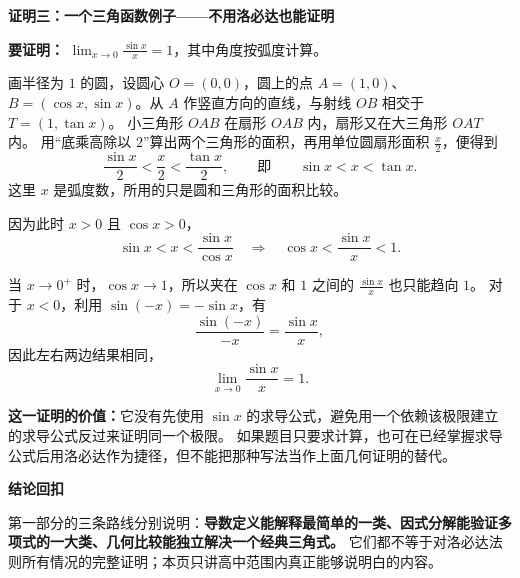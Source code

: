 \begin{proofbox}
\textbf{\textcolor{CProof}{证明三：一个三角函数例子——不用洛必达也能证明}}
\begin{center}\end{center}


\textbf{要证明：} $\displaystyle\lim_{x\to0}\frac{\sin x}{x}=1$，其中角度按弧度计算。

\begin{description}[style=nextline, leftmargin=2.6em, labelsep=0.4em, itemsep=0.55em]
    \item[\textbf{第1步：先研究 $0<x<\frac\pi2$。}]
    画半径为 $1$ 的圆，设圆心 $O=(0,0)$，圆上的点 $A=(1,0)$、
    $B=(\cos x,\sin x)$。从 $A$ 作竖直方向的直线，与射线 $OB$ 相交于 $T=(1,\tan x)$。
    小三角形 $OAB$ 在扇形 $OAB$ 内，扇形又在大三角形 $OAT$ 内。
    用“底乘高除以 $2$”算出两个三角形的面积，再用单位圆扇形面积 $\frac{x}{2}$，便得到
    \[
      \frac{\sin x}{2}<\frac{x}{2}<\frac{\tan x}{2},
      \qquad\text{即}\qquad\sin x<x<\tan x.
    \]
    这里 $x$ 是弧度数，所用的只是圆和三角形的面积比较。

    \item[\textbf{第2步：整理成要研究的比值。}]
    因为此时 $x>0$ 且 $\cos x>0$，
    \[
      \sin x<x<\frac{\sin x}{\cos x}
      \quad\Longrightarrow\quad
      \cos x<\frac{\sin x}{x}<1.
    \]

    \item[\textbf{第3步：让角度越来越小。}]
    当 $x\to0^+$ 时，$\cos x\to1$，所以夹在 $\cos x$ 和 $1$ 之间的 $\frac{\sin x}{x}$ 也只能趋向 $1$。
    对于 $x<0$，利用 $\sin(-x)=-\sin x$，有
    \[
      \frac{\sin(-x)}{-x}=\frac{\sin x}{x},
    \]
    因此左右两边结果相同，
    \[
      \boxed{\displaystyle\lim_{x\to0}\frac{\sin x}{x}=1.}
    \]
\end{description}

\textbf{这一证明的价值：}它没有先使用 $\sin x$ 的求导公式，避免用一个依赖该极限建立的求导公式反过来证明同一个极限。
如果题目只要求计算，也可在已经掌握求导公式后用洛必达作为捷径，但不能把那种写法当作上面几何证明的替代。

\medskip
\textbf{\textcolor{CProof}{结论回扣}}

第一部分的三条路线分别说明：\textbf{导数定义能解释最简单的一类、因式分解能验证多项式的一大类、几何比较能独立解决一个经典三角式。}
它们都不等于对洛必达法则所有情况的完整证明；本页只讲高中范围内真正能够说明白的内容。

\end{proofbox}

